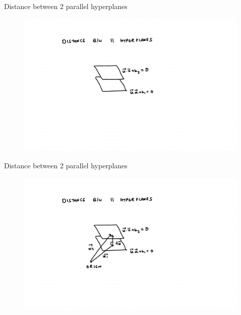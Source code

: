\documentclass{beamer}
\begin{document}
\begin{frame}{Distance between 2 parallel hyperplanes}

\begin{figure}
\includegraphics[scale=0.5]{SVM/Svm-17.pdf}
\end{figure}

\end{frame}

\begin{frame}{Distance between 2 parallel hyperplanes}

\begin{figure}
\includegraphics[scale=0.5]{SVM/Svm-18.pdf}
\end{figure}

\end{frame}
\end{document}
